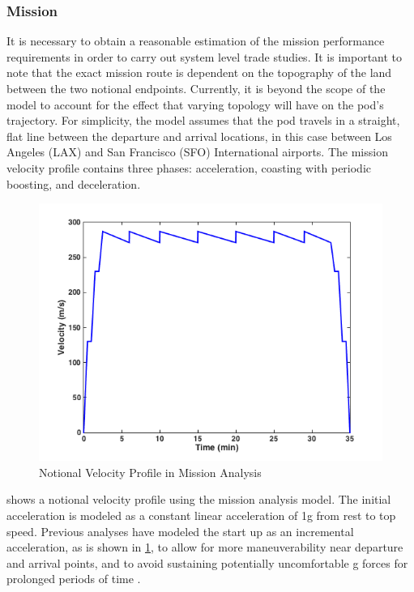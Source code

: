 
\subsubsection{Mission}
	It is necessary to obtain a reasonable estimation of the mission
	performance requirements in order to carry out system level trade studies.
	It is important to note that the exact mission route is dependent on the
	topography of the land between the two notional endpoints. Currently, it is
	beyond the scope of the model to account for the effect that varying
	topology will have on the pod’s trajectory. For simplicity, the model
	assumes that the pod travels in a straight, flat line between the departure
	and arrival locations, in this case between Los Angeles (LAX) and San
	Francisco (SFO) International airports.
	The mission velocity profile contains three phases: acceleration, coasting
	with periodic boosting, and deceleration.
	\begin{figure}
		\centering
		\includegraphics{../images/mission_profile.png}
		\caption{Notional Velocity Profile in Mission Analysis}
		\label{fig:mission_profile}
	\end{figure}
	 shows a notional velocity profile using the
	mission analysis model. The initial acceleration is
	modeled as a constant linear acceleration of 1g from rest to top speed.
	Previous analyses have modeled the start up as an incremental acceleration,
	as is shown in \cref{fig:mission_profile}, to allow for more maneuverability
	near departure and arrival points, and to avoid sustaining potentially
	uncomfortable g forces for prolonged periods of time \cite{Chin}.
